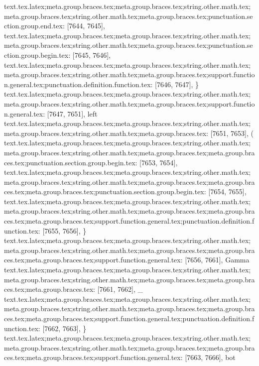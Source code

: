{{{{{{{{{{{{{{{{{{{{{{{{{{{{{{{{{{{{{{{{{{{{{{{{{{{{{{{{{{{{{{{{{{{{{{{{{{{{{{{{{{{{{{{{{{{{{{{{{{{{{{{{{{{{{{{{{{{{{{{{{{{{{{{{{{{{{{{{{{{{{{{{{{{{{{{{{{{{{{{{{{{{{{{{{{{{{{{{{{{{{{{{{{{{{{{{{{{{{{{{{{{{{{{{{{{{text.tex.latex;meta.group.braces.tex;meta.group.braces.tex;string.other.math.tex;meta.group.braces.tex;string.other.math.tex;meta.group.braces.tex;punctuation.section.group.end.tex: [7644, 7645], {}}
text.tex.latex;meta.group.braces.tex;meta.group.braces.tex;string.other.math.tex;meta.group.braces.tex;string.other.math.tex;meta.group.braces.tex;punctuation.section.group.begin.tex: [7645, 7646], {{}
text.tex.latex;meta.group.braces.tex;meta.group.braces.tex;string.other.math.tex;meta.group.braces.tex;string.other.math.tex;meta.group.braces.tex;support.function.general.tex;punctuation.definition.function.tex: [7646, 7647], {\}
text.tex.latex;meta.group.braces.tex;meta.group.braces.tex;string.other.math.tex;meta.group.braces.tex;string.other.math.tex;meta.group.braces.tex;support.function.general.tex: [7647, 7651], {left}
text.tex.latex;meta.group.braces.tex;meta.group.braces.tex;string.other.math.tex;meta.group.braces.tex;string.other.math.tex;meta.group.braces.tex: [7651, 7653], {( }
text.tex.latex;meta.group.braces.tex;meta.group.braces.tex;string.other.math.tex;meta.group.braces.tex;string.other.math.tex;meta.group.braces.tex;meta.group.braces.tex;punctuation.section.group.begin.tex: [7653, 7654], {{}
text.tex.latex;meta.group.braces.tex;meta.group.braces.tex;string.other.math.tex;meta.group.braces.tex;string.other.math.tex;meta.group.braces.tex;meta.group.braces.tex;meta.group.braces.tex;punctuation.section.group.begin.tex: [7654, 7655], {{}
text.tex.latex;meta.group.braces.tex;meta.group.braces.tex;string.other.math.tex;meta.group.braces.tex;string.other.math.tex;meta.group.braces.tex;meta.group.braces.tex;meta.group.braces.tex;support.function.general.tex;punctuation.definition.function.tex: [7655, 7656], {\}
text.tex.latex;meta.group.braces.tex;meta.group.braces.tex;string.other.math.tex;meta.group.braces.tex;string.other.math.tex;meta.group.braces.tex;meta.group.braces.tex;meta.group.braces.tex;support.function.general.tex: [7656, 7661], {Gamma}
text.tex.latex;meta.group.braces.tex;meta.group.braces.tex;string.other.math.tex;meta.group.braces.tex;string.other.math.tex;meta.group.braces.tex;meta.group.braces.tex;meta.group.braces.tex: [7661, 7662], {_}
text.tex.latex;meta.group.braces.tex;meta.group.braces.tex;string.other.math.tex;meta.group.braces.tex;string.other.math.tex;meta.group.braces.tex;meta.group.braces.tex;meta.group.braces.tex;support.function.general.tex;punctuation.definition.function.tex: [7662, 7663], {\}
text.tex.latex;meta.group.braces.tex;meta.group.braces.tex;string.other.math.tex;meta.group.braces.tex;string.other.math.tex;meta.group.braces.tex;meta.group.braces.tex;meta.group.braces.tex;support.function.general.tex: [7663, 7666], {bot}
}}}}}}}}}}}}}}}}}}}}}}}}}}}}}}}}}}}}}}}}}}}}}}}}}}}}}}}}}}}}}}}}}}}}}}}}}}}}}}}}}}}}}}}}}}}}}}}}}}}}}}}}}}}}}}}}}}}}}}}}}}}}}}}}}}}}}}}}}}}}}}}}}}}}}}}}}}}}}}}}}}}}}}}}}}}}}}}}}}}}}}}}}}}}}}}}}}}}}}}}}}}}}}}}}}}}}}}}}
